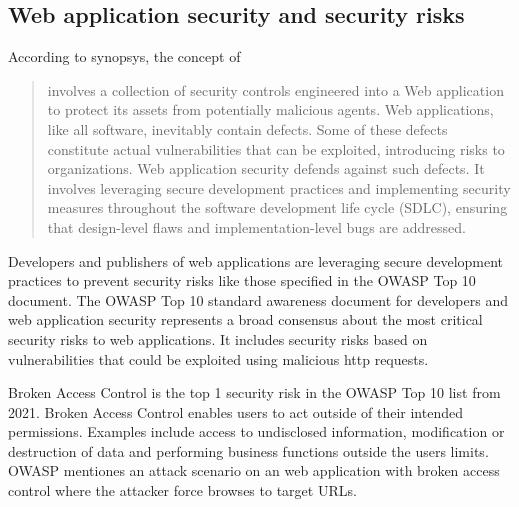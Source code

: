 \subsection{Web application security and security risks}
According to synopsys, the concept of 
\begin{quote}
	involves a collection of security controls engineered into a Web application to protect its assets from potentially malicious agents. Web applications, like all software, inevitably contain defects. Some of these defects constitute actual vulnerabilities that can be exploited, introducing risks to organizations. Web application security defends against such defects. It involves leveraging secure development practices and implementing security measures throughout the software development life cycle (SDLC), ensuring that design-level flaws and implementation-level bugs are addressed.
\end{quote}
Developers and publishers of web applications are leveraging secure development practices to prevent security risks like those specified in the OWASP Top 10 document.
The OWASP Top 10 standard awareness document for developers and web application security represents a broad consensus about the most critical security risks to web applications.
It includes security risks based on vulnerabilities that could be exploited using malicious \acrshort{http} requests.
\cite{OWASP/Top10}

Broken Access Control is the top 1 security risk in the OWASP Top 10 list from 2021.
Broken Access Control enables users to act outside of their intended permissions.
Examples include access to undisclosed information, modification or destruction of data and performing business functions outside the users limits.
OWASP mentiones an attack scenario on an web application with broken access control where the attacker force browses to target URLs. \cite{OWASP/BrokenAccessControl,OWASP/Risks2021} 

